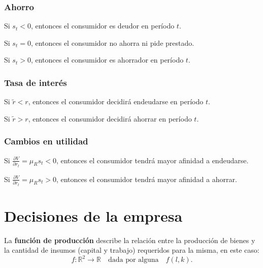 \documentclass[8pt,a4paper]{extarticle}
\begin{document}
\begin{multicols}{3}
\subsubsection*{Ahorro}

\begin{eqlist}
\item Si $s_t < 0$, entonces el consumidor es deudor en período $t$.
\item Si $s_t = 0$, entonces el consumidor no ahorra ni pide prestado.
\item Si $s_t > 0$, entonces el consumidor es ahorrador en período $t$.
\end{eqlist}

\subsubsection*{Tasa de interés}

\begin{eqlist}
\item Si $ \tilde{r} < r $, entonces el consumidor decidirá endeudarse en período $t$.
\item Si $ \tilde{r} > r $, entonces el consumidor decidirá ahorrar en período $t$.
\end{eqlist}

\subsubsection*{Cambios en utilidad}

\begin{eqlist}
\item Si $\displaystyle \frac{\partial V}{\partial r_t} = \mu_R s_t < 0$, entonces el consumidor tendrá mayor afinidad a endeudarse.
\item Si $\displaystyle \frac{\partial V}{\partial r_t} = \mu_R s_t > 0$, entonces el consumidor tendrá mayor afinidad a ahorrar.
\end{eqlist}

\newpage

\section{Decisiones de la empresa}

\begin{boxdef}
	La \textbf{función de producción} describe la relación entre la producción de bienes y la cantidad de insumos (capital y trabajo) requeridos para la misma, en este caso:
	\[
		f: \mathbb{R}^2 \to \mathbb{R} \quad \text{dada por alguna} \quad f(l, k)
	.\] 
\end{boxdef}


\end{multicols}
\end{document}
